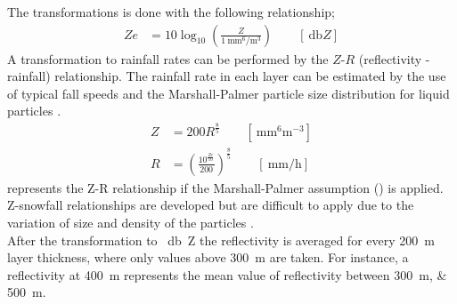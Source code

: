 The transformations is done with the following relationship;
\begin{align}
	Ze & = 10 \log_{10} \left(\frac{Z}{\SI{1}{\mm^6\per\metre^3}}\right) \qquad [\SI{}{\decibel Z}]
	\label{eq:Ze}
\end{align}
A transformation to rainfall rates can be performed by the $Z$-$R$ (reflectivity - rainfall) relationship. 
The rainfall rate in each layer can be estimated by the use of typical fall speeds and the Marshall-Palmer particle size distribution for liquid particles \citep{rinehart_radar_2010}. 
\begin{align}
	Z & = 200 R^{\frac{8}{5}} \qquad [\SI{}{\mm^6\metre^{-3}} ] \nonumber \\ 
	R & = \left( \frac{ 10^{\frac{Ze}{10}} }{200} \right)^{\frac{8}{5}} \qquad [ \SI{}{\mm\per\hour} ]
	\label{eq:Z-R}
\end{align}
% 
{} represents the Z-R relationship if the Marshall-Palmer assumption () is applied. Z-snowfall relationships are developed but are difficult to apply due to the variation of size and density of the particles \citep{lecuyer_aos_2017}. \\
After the transformation to \SI{}{\decibel Z} the reflectivity is averaged for every \SI{200}{\metre} layer thickness, where only values above \SI{300}{\metre} are taken. %
For instance, a reflectivity at \SI{400}{\metre} represents the mean value of reflectivity between \SIlist{300;500}{\metre}. 


